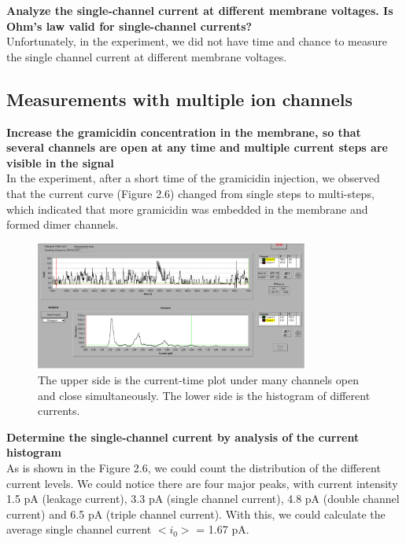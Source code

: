 \documentclass[a4paper,english,12pt,bibliography=totoc]{scrreprt}
\begin{document}
\textbf{Analyze the single-channel current at different membrane voltages. Is Ohm’s law
valid for single-channel currents?}\\
Unfortunately, in the experiment, we did not have time and chance to measure the single channel current at different membrane voltages. \\

\subsection{Measurements with multiple ion channels}


\textbf{Increase the gramicidin concentration in the membrane, so that several channels
are open at any time and multiple current steps are visible in the signal}\\
In the experiment, after a short time of the gramicidin injection, we observed that the current curve (Figure 2.6) changed from single steps to multi-steps, which indicated that more gramicidin was embedded in the membrane and formed dimer channels. 

\begin{figure}[H]
    \centering
    \includegraphics[width = 0.8\textwidth]{Group 8/Histogram2.PNG}
    \caption{The upper side is the  current-time plot under many channels open and close simultaneously. The lower side is the histogram of different currents.}
    \label{fig:enter-label}
\end{figure}
\textbf{Determine the single-channel current by analysis of the current histogram}\\

As is shown in the Figure 2.6, we could count the distribution of the different current levels. We could notice there are four major peaks, with current intensity 1.5 pA (leakage current), 3.3 pA (single channel current), 4.8 pA (double channel current) and 6.5 pA (triple channel current). With this, we could calculate the average single channel current $<i_0>$ = 1.67 pA.
\\
\end{document}

